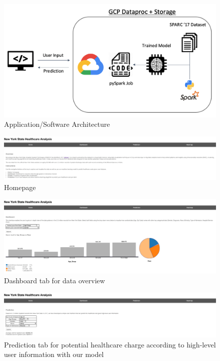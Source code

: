 \documentclass[10pt,twocolumn,letterpaper]{article}
\begin{document}
\begin{figure}
\includegraphics[scale=0.57]{arch.png}
\caption{Application/Software Architecture}
\end{figure}

\begin{figure}
\includegraphics[scale=0.57]{homepage.png}
\caption{Homepage}
\end{figure}

\begin{figure}
\includegraphics[scale=0.57]{dashboard.png}
\caption{Dashboard tab for data overview}
\end{figure}

\begin{figure}
\includegraphics[scale=0.57]{prediction.png}
\caption{Prediction tab for potential healthcare charge according to high-level user information with our model}
\end{figure}
\end{document}
